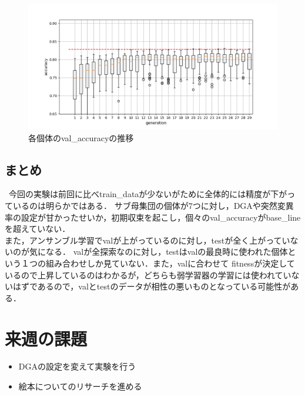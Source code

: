 \documentclass[twocolumn]{jarticle}     %
\begin{document}
\begin{figure}[b]
	\centering
	\includegraphics[scale=0.8]{graph2.png}
	\caption{各個体のval\_accuracyの推移\label{fig:graph2}}
\end{figure}

\subsection{まとめ}
\ 今回の実験は前回に比べtrain\_dataが少ないがために全体的には精度が下がっているのは明らかではある．
サブ母集団の個体が7つに対し，DGAや突然変異率の設定が甘かったせいか，初期収束を起こし，個々のval\_accuracyがbase\_lineを超えていない．\\
また，アンサンブル学習でvalが上がっているのに対し，testが全く上がっていないのが気になる．
valが全探索なのに対し，testはvalの最良時に使われた個体という１つの組み合わせしか見ていない．また，valに合わせて
fitnessが決定しているので上昇しているのはわかるが，どちらも弱学習器の学習には使われていないはずであるので，valとtestのデータが相性の悪いものとなっている可能性がある．

\section{来週の課題}
\begin{itemize}
	\item DGAの設定を変えて実験を行う
	\item 絵本についてのリサーチを進める
\end{itemize}



\end{document}
